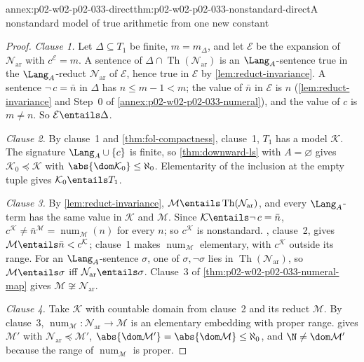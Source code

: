 \begin{annexitem}{annex:p02-w02-p02-033-direct}{thm:p02-w02-p02-033-nonstandard-direct}{A nonstandard model of true arithmetic from one new constant}
\begin{proof}
\emph{Clause 1.}  Let \(\Delta\subseteq T_1\) be finite, \(m=m_\Delta\), and
let \(\mathcal E\) be the expansion of \(\mathcal N_{\mathrm{ar}}\) with
\(c^{\mathcal E}=m\).  A sentence of
\(\Delta\cap\operatorname{Th}(\mathcal N_{\mathrm{ar}})\) is an
\(\Lang_A\)-sentence true in the \(\Lang_A\)-reduct
\(\mathcal N_{\mathrm{ar}}\) of \(\mathcal E\), hence true in \(\mathcal E\)
by \cref{lem:reduct-invariance}.  A sentence \(\neg\,c=\bar n\) in
\(\Delta\) has \(n\leq m-1<m\); the value of \(\bar n\) in \(\mathcal E\) is
\(n\) (\cref{lem:reduct-invariance} and Step~0 of
\cref{annex:p02-w02-p02-033-numeral}), and the value of \(c\) is \(m\ne n\).
So \(\mathcal E\entails\Delta\).

\emph{Clause 2.}  By clause~1 and \cref{thm:fol-compactness}, clause~1,
\(T_1\) has a model \(\mathcal K\).  The signature \(\Lang_A\cup\{c\}\) is
finite, so \cref{thm:downward-ls} with \(A=\varnothing\) gives
\(\mathcal K_0\preccurlyeq\mathcal K\) with
\(\abs{\dom\mathcal K_0}\leq\aleph_0\).  Elementarity of the inclusion at
the empty tuple gives \(\mathcal K_0\entails T_1\).

\emph{Clause 3.}  By \cref{lem:reduct-invariance},
\(\mathcal M\entails\operatorname{Th}(\mathcal N_{\mathrm{ar}})\), and every
\(\Lang_A\)-term has the same value in \(\mathcal K\) and \(\mathcal M\).
Since \(\mathcal K\entails\neg\,c=\bar n\),
\(c^{\mathcal K}\ne\bar n^{\mathcal M}=\operatorname{num}_{\mathcal M}(n)\)
for every \(n\); so \(c^{\mathcal K}\) is nonstandard.
, clause~2, gives
\(\mathcal M\entails\bar n<c^{\mathcal K}\); clause~1 makes
\(\operatorname{num}_{\mathcal M}\) elementary, with \(c^{\mathcal K}\)
outside its range.  For an \(\Lang_A\)-sentence \(\sigma\), one of
\(\sigma,\neg\sigma\) lies in \(\operatorname{Th}(\mathcal N_{\mathrm{ar}})\),
so \(\mathcal M\entails\sigma\) iff
\(\mathcal N_{\mathrm{ar}}\entails\sigma\).  Clause~3 of
\cref{thm:p02-w02-p02-033-numeral-map} gives
\(\mathcal M\not\cong\mathcal N_{\mathrm{ar}}\).

\emph{Clause 4.}  Take \(\mathcal K\) with countable domain from clause~2
and its reduct \(\mathcal M\).  By clause~3,
\(\operatorname{num}_{\mathcal M}:\mathcal N_{\mathrm{ar}}\to\mathcal M\) is
an elementary embedding with proper range.
 gives \(\mathcal M'\) with
\(\mathcal N_{\mathrm{ar}}\preccurlyeq\mathcal M'\),
\(\abs{\dom\mathcal M'}=\abs{\dom\mathcal M}\leq\aleph_0\), and
\(\N\ne\dom\mathcal M'\) because the range of
\(\operatorname{num}_{\mathcal M}\) is proper.
\end{proof}
\end{annexitem}

